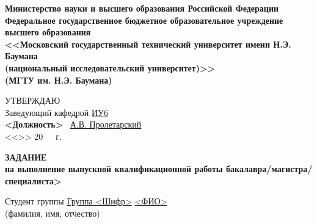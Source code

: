 \documentclass[14pt, left=25mm, right=15mm, top=20mm, bottom=10mm]{templateTaskBMSTU}
\begin{document}
	\thispagestyle{empty}
	\begin{center}
		\fontsize{12pt}{0.3\baselineskip}\selectfont \textbf{Министерство науки и высшего образования Российской Федерации 
		\\ Федеральное государственное бюджетное образовательное учреждение 
		\\ высшего образования 
		\\ <<Московский государственный технический университет имени Н.Э. Баумана
		\\ (национальный исследовательский университет)>>
		\\ (МГТУ им. Н.Э. Баумана)}
		
		\fontsize{12pt}{0.5\baselineskip}\selectfont
		\noindent \makebox[\linewidth]{\rule{\textwidth}{4pt}} \makebox[\linewidth]{\rule{\textwidth}{1pt}}
	\end{center}

	\begin{flushright}
		\fontsize{12pt}{\baselineskip}\selectfont 
		УТВЕРЖДАЮ \hspace*{1.4cm}
		\\ Заведующий кафедрой \uline{\hspace*{0.5cm}}\uline{ИУ6}\uline{\hspace*{0.5cm}} 
		\\ \hfill \textbf{<Должность>} \uline{\hspace*{2.5cm}} \ \uline{А.В. Пролетарский} 
		\\ <<\uline{\hspace*{1cm}}>> \uline{\hspace*{2.5cm}} 20\ \ \   г.
	\end{flushright}

	\vfill

	\begin{center}
		\fontsize{18pt}{\baselineskip}\selectfont \textbf{ЗАДАНИЕ}
		\\ \fontsize{16pt}{\baselineskip}\selectfont \textbf{на выполнение выпускной квалификационной работы бакалавра/магистра/специалиста>}
	\end{center}

	\normalsize

	\begin{flushleft}
		\fontsize{12pt}{\baselineskip}\selectfont

		Студент группы  \uline{\hspace*{0.5cm}}\uline{Группа <Шифр>}\uline{\hspace*{0.5cm}}
		\center \uline{ \hfill} 
		\\ (фамилия, имя, отчество)
	\end{flushleft}
\end{document}
